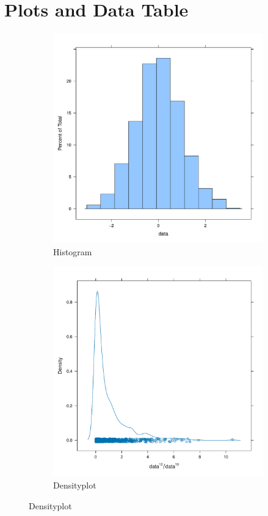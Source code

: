 \documentclass[a4paper,12pt]{article}
\begin{document}
\section{Plots and Data Table}
\begin{figure}[htbp]
    \centering
    \begin{subfigure}[t]{0.45\textwidth}
        \centering
        \includegraphics[width=\textwidth]{histogram.pdf} 
        \caption{Histogram}
    \end{subfigure}
    \hfill
    \begin{subfigure}[t]{0.45\textwidth}
        \centering
        \includegraphics[width=\textwidth]{densityplot.pdf} %
        \caption{Densityplot}
    \end{subfigure}
    

\end{figure}
\end{document}
